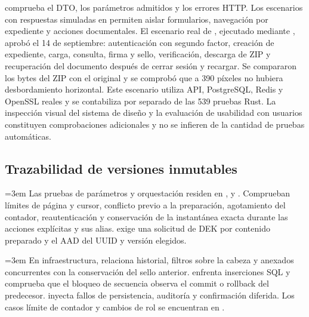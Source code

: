  comprueba el DTO, los parámetros admitidos y los errores HTTP. Los escenarios con respuestas simuladas en  permiten aislar formularios, navegación por expediente y acciones documentales. El escenario real de , ejecutado mediante , aprobó el 14 de septiembre: autenticación con segundo factor, creación de expediente, carga, consulta, firma y sello, verificación, descarga de ZIP y recuperación del documento después de cerrar sesión y recargar. Se compararon los bytes del ZIP con el original y se comprobó que a 390 píxeles no hubiera desbordamiento horizontal. Este escenario utiliza API, PostgreSQL, Redis y OpenSSL reales y se contabiliza por separado de las 539 pruebas Rust. La inspección visual del sistema de diseño y la evaluación de usabilidad con usuarios constituyen comprobaciones adicionales y no se infieren de la cantidad de pruebas automáticas.

\subsection{Trazabilidad de versiones inmutables}\label{sec:matriz-versiones}

{\emergencystretch=3em Las pruebas de parámetros y orquestación residen en ,  y . Comprueban límites de página y cursor, conflicto previo a la preparación, agotamiento del contador, reautenticación y conservación de la instantánea exacta durante las acciones explícitas y sus alias.  exige una solicitud de DEK por contenido preparado y el AAD del UUID y versión elegidos.\par}

{\emergencystretch=3em En infraestructura,  relaciona historial, filtros sobre la cabeza y anexados concurrentes con la conservación del sello anterior.  enfrenta inserciones SQL y comprueba que el bloqueo de secuencia observa el commit o rollback del predecesor.  inyecta fallos de persistencia, auditoría y confirmación diferida. Los casos límite de contador y cambios de rol se encuentran en .\par}

